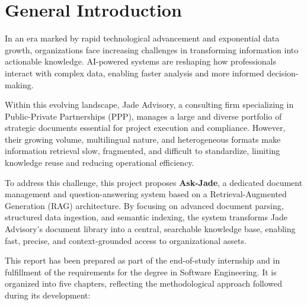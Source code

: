 \chapter*{General Introduction}

In an era marked by rapid technological advancement and exponential data
growth, organizations face increasing challenges in transforming information
into actionable knowledge. AI-powered systems are reshaping how professionals
interact with complex data, enabling faster analysis and more informed
decision-making.

Within this evolving landscape, Jade Advisory, a consulting firm
specializing in Public-Private Partnerships (PPP), manages a large and
diverse portfolio of strategic documents essential for project execution
and compliance. However, their growing volume, multilingual nature, and
heterogeneous formats make information retrieval slow, fragmented, and
difficult to standardize, limiting knowledge reuse and reducing operational
efficiency.

To address this challenge, this project proposes \textbf{Ask-Jade}, a dedicated 
document management and question-answering system based on a 
Retrieval-Augmented Generation (RAG) architecture. By focusing on advanced 
document parsing, structured data ingestion, and semantic indexing, the system 
transforms Jade Advisory's document library into a central, searchable knowledge 
base, enabling fast, precise, and context-grounded access to organizational 
assets.

This report has been prepared as part of the end-of-study internship and
in fulfillment of the requirements for the degree in Software Engineering.
It is organized into five chapters, reflecting the methodological approach
followed during its development:

